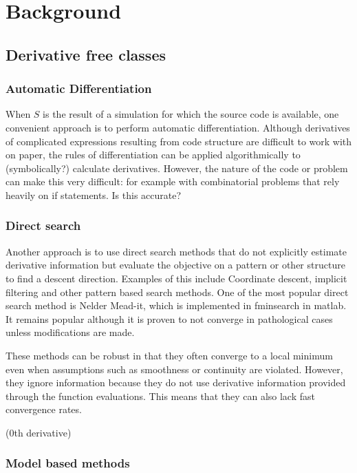 \documentclass{article}
\begin{document}
\section{Background}
\subsection{Derivative free classes}
\subsubsection{Automatic Differentiation}

When $S$ is the result of a simulation for which the source code is available, one convenient approach is to perform automatic differentiation.
Although derivatives of complicated expressions resulting from code structure are difficult to work with on paper, the rules of differentiation can be applied algorithmically to \color{red}(symbolically?) \color{black} calculate derivatives.
However, the nature of the code or problem can make this very difficult: for example with combinatorial problems that rely heavily on if statements.
\color{red} Is this accurate? \color{black}

\subsubsection{Direct search}


Another approach is to use direct search methods that do not explicitly estimate derivative information but evaluate the objective on a pattern or other structure to find a descent direction.
Examples of this include Coordinate descent, implicit filtering and other pattern based search methods.
One of the most popular direct search method is Nelder Mead-it, which is implemented in fminsearch in matlab.
It remains popular although it is proven to not converge in pathological cases unless modifications are made.

These methods can be robust in that they often converge to a local minimum even when assumptions such as smoothness or continuity are violated.
However, they ignore information because they do not use derivative information provided through the function evaluations.
This means that they can also lack fast convergence rates.

\color{red}
(0th derivative)
\color{black}

\subsubsection{Model based methods}
\end{document}
